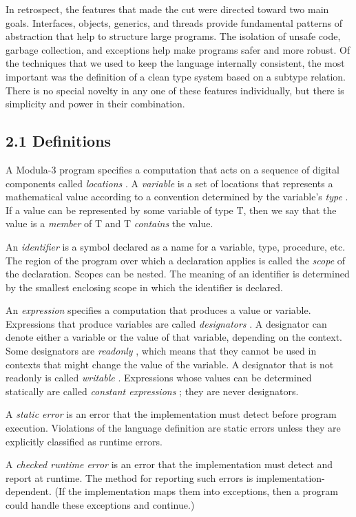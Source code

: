 \documentclass[10pt]{article}
\begin{document}
In retrospect, the features that made the cut were directed toward two main
goals.  Interfaces, objects, generics, and threads provide fundamental patterns
of abstraction that help to structure large programs.  The isolation of unsafe
code, garbage collection, and exceptions help make programs safer and more
robust.  Of the techniques that we used to keep the language internally
consistent, the most important was the definition of a clean type system based
on a subtype relation.  There is no special novelty in any one of these
features individually, but there is simplicity and power in their combination.

\subsection*{2.1 Definitions}

A Modula-3 program specifies a computation that acts on a sequence of digital
components called \emph{locations} .  A \emph{variable} is a set of locations
that represents a mathematical value according to a convention determined by
the variable's \emph{type} .  If a value can be represented by some variable of
type T, then we say that the value is a \emph{member} of T and T
\emph{contains} the value.

An \emph{identifier} is a symbol declared as a name for a variable, type,
procedure, etc.  The region of the program over which a declaration applies is
called the \emph{scope} of the declaration.  Scopes can be nested.  The meaning
of an identifier is determined by the smallest enclosing scope in which the
identifier is declared.

An \emph{expression} specifies a computation that produces a value or
variable.  Expressions that produce variables are called \emph{designators} .  A
designator can denote either a variable or the value of that variable,
depending on the context.  Some designators are \emph{readonly} , which means
that they cannot be used in contexts that might change the value of the
variable.  A designator that is not readonly is called \emph{writable}
.  Expressions whose values can be determined statically are called
\emph{constant expressions} ; they are never designators.

A \emph{static error} is an error that the implementation must detect before
program execution.  Violations of the language definition are static errors
unless they are explicitly classified as runtime errors.

A \emph{checked runtime error} is an error that the implementation must detect
and report at runtime.  The method for reporting such errors is
implementation-dependent.  (If the implementation maps them into exceptions,
then a program could handle these exceptions and continue.)
\end{document}
